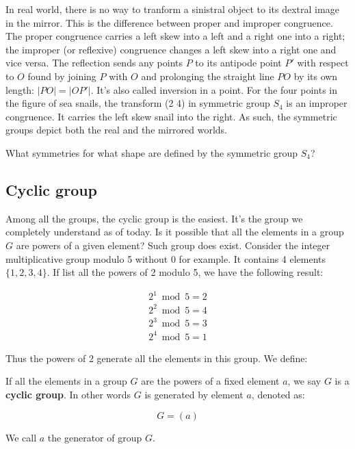 \documentclass[b5paper]{article}
\begin{document}
In real world, there is no way to tranform a sinistral object to its dextral image in the mirror. This is the difference between proper and improper congruence. The proper congruence carries a left skew into a left and a right one into a right; the improper (or reflexive) congruence changes a left skew into a right one and vice versa\cite{Weyl1952}. The reflection sends any points $P$ to its antipode point $P'$ with respect to $O$ found by joining $P$ with $O$ and prolonging the straight line $PO$ by its own length: $|PO| = |OP'|$. It's also called inversion in a point. For the four points in the figure of sea snails, the transform (2 4) in symmetric group $S_4$ is an improper congruence. It carries the left skew snail into the right. As such, the symmetric groups depict both the real and the mirrored worlds.

\begin{Exercise}
What symmetries for what shape are defined by the symmetric group $S_4$?
\end{Exercise}

\subsection{Cyclic group}

Among all the groups, the cyclic group is the easiest. It's the group we completely understand as of today. Is it possible that all the elements in a group $G$ are powers of a given element? Such group does exist. Consider the integer multiplicative group modulo 5 without 0 for example. It contains 4 elements $\{1, 2, 3, 4\}$. If list all the powers of 2 modulo 5, we have the following result:

\[
\begin{array}{l}
2^1 \bmod 5 = 2 \\
2^2 \bmod 5 = 4 \\
2^3 \bmod 5 = 3 \\
2^4 \bmod 5 = 1
\end{array}
\]

Thus the powers of 2 generate all the elements in this group. We define:

\begin{definition}
If all the elements in a group $G$ are the powers of a fixed element $a$, we say $G$ is a \textbf{cyclic group}. In other words $G$ is generated by element $a$, denoted as:

\[
G = (a)
\]

We call $a$ the generator of group $G$.
\end{definition}
\end{document}
